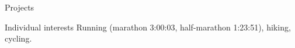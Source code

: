 \documentclass{resume} %
\begin{document}
\begin{rSection}{Projects}
\end{rSection}

\begin{rSection}{Individual interests}
Running (marathon 3:00:03, half-marathon 1:23:51), hiking, cycling.
\end{rSection}
\end{document}
